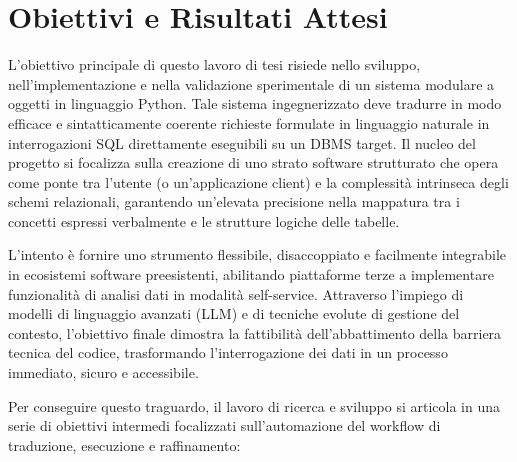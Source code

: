 \section{Obiettivi e Risultati
Attesi}\label{obiettivi-e-risultati-attesi}

L'obiettivo principale di questo lavoro di tesi risiede nello sviluppo,
nell'implementazione e nella validazione sperimentale di un sistema
modulare a oggetti in linguaggio Python. Tale sistema ingegnerizzato deve tradurre in
modo efficace e sintatticamente coerente richieste formulate in
linguaggio naturale in interrogazioni SQL direttamente eseguibili su un
DBMS target. Il nucleo del progetto si focalizza sulla creazione di uno
strato software strutturato che opera come ponte tra l'utente (o
un'applicazione client) e la complessità intrinseca degli schemi
relazionali, garantendo un'elevata precisione nella mappatura tra i
concetti espressi verbalmente e le strutture logiche delle tabelle.

L'intento è fornire uno strumento flessibile, disaccoppiato e facilmente
integrabile in ecosistemi software preesistenti, abilitando piattaforme
terze a implementare funzionalità di analisi dati in modalità
self-service. Attraverso l'impiego di modelli di linguaggio avanzati
(LLM) e di tecniche evolute di gestione del contesto, l'obiettivo finale
dimostra la fattibilità dell'abbattimento della barriera tecnica del
codice, trasformando l'interrogazione dei dati in un processo immediato,
sicuro e accessibile.

Per conseguire questo traguardo, il lavoro di ricerca e sviluppo si
articola in una serie di obiettivi intermedi focalizzati
sull'automazione del workflow di traduzione, esecuzione e raffinamento:

